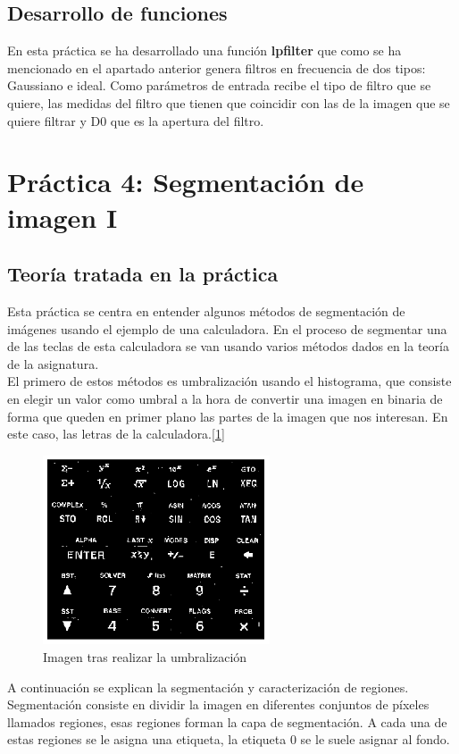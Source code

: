 \documentclass[a4paper,12pt]{report}
\begin{document}
\subsection{Desarrollo de funciones}

En esta práctica se ha desarrollado una función \textbf{lpfilter} que como se ha mencionado en el apartado anterior genera filtros en frecuencia de dos tipos: Gaussiano e ideal. Como parámetros de entrada recibe el tipo de filtro que se quiere, las medidas del filtro que tienen que coincidir con las de la imagen que se quiere filtrar y D0 que es la apertura del filtro.\\

\section{ Práctica 4: Segmentación de imagen I}
\subsection{Teoría tratada en la práctica}

Esta práctica se centra en entender algunos métodos de segmentación de imágenes usando el ejemplo de una calculadora. En el proceso de segmentar una de las teclas de esta calculadora se van usando varios métodos dados en la teoría de la asignatura.\\

El primero de estos métodos es umbralización usando el histograma, que consiste en elegir un valor como umbral a la hora de convertir una imagen en binaria de forma que queden en primer plano las partes de la imagen que nos interesan. En este caso, las letras de la calculadora.[\ref{thresholding}]\\

\begin{figure}[h]
\centering
\includegraphics[width=0.6\textwidth]{imagenes/thresholding}
\caption{Imagen tras realizar la umbralización}
\label{thresholding}
\end{figure}
A continuación se explican la segmentación y caracterización de regiones. Segmentación consiste en dividir la imagen en diferentes conjuntos de píxeles llamados regiones, esas regiones forman la capa de segmentación. A cada una de estas regiones se le asigna una etiqueta, la etiqueta 0 se le suele asignar al fondo.\\
\end{document}
